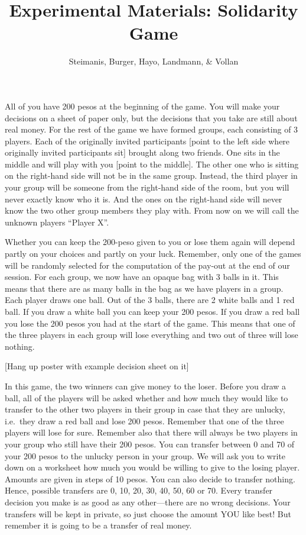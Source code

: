 \documentclass[11pt,a4paper]{article}
\title{Experimental Materials: Solidarity Game}
\author{Steimanis, Burger, Hayo, Landmann, \& Vollan}
\date{}
\begin{document}
\maketitle

All of you have 200 pesos at the beginning of the game. You will make your decisions on a sheet of paper only, but the decisions that you take are still about real money. For the rest of the game we have formed groups, each consisting of 3 players. Each of the originally invited participants [point to the left side where originally invited participants sit] brought along two friends. One sits in the middle and will play with you [point to the middle]. The other one who is sitting on the right-hand side will not be in the same group. Instead, the third player in your group will be someone from the right-hand side of the room, but you will never exactly know who it is. And the ones on the right-hand side will never know the two other group members they play with. From now on we will call the unknown players ``Player X''.

Whether you can keep the 200-peso given to you or lose them again will depend partly on your choices and partly on your luck. Remember, only one of the games will be randomly selected for the computation of the pay-out at the end of our session. For each group, we now have an opaque bag with 3 balls in it. This means that there are as many balls in the bag as we have players in a group. Each player draws one ball. Out of the 3 balls, there are 2 white balls and 1 red ball. If you draw a white ball you can keep your 200 pesos. If you draw a red ball you lose the 200 pesos you had at the start of the game. This means that one of the three players in each group will lose everything and two out of three will lose nothing.

\begin{center}[Hang up poster with example decision sheet on it]\end{center}

In this game, the two winners can give money to the loser. Before you draw a ball, all of the players will be asked whether and how much they would like to transfer to the other two players in their group in case that they are unlucky, i.e.\ they draw a red ball and lose 200 pesos. Remember that one of the three players will lose for sure. Remember also that there will always be two players in your group who still have their 200 pesos. You can transfer between 0 and 70 of your 200 pesos to the unlucky person in your group. We will ask you to write down on a worksheet how much you would be willing to give to the losing player. Amounts are given in steps of 10 pesos. You can also decide to transfer nothing. Hence, possible transfers are 0, 10, 20, 30, 40, 50, 60 or 70. Every transfer decision you make is as good as any other---there are no wrong decisions. Your transfers will be kept in private, so just choose the amount YOU like best! But remember it is going to be a transfer of real money.
\end{document}

